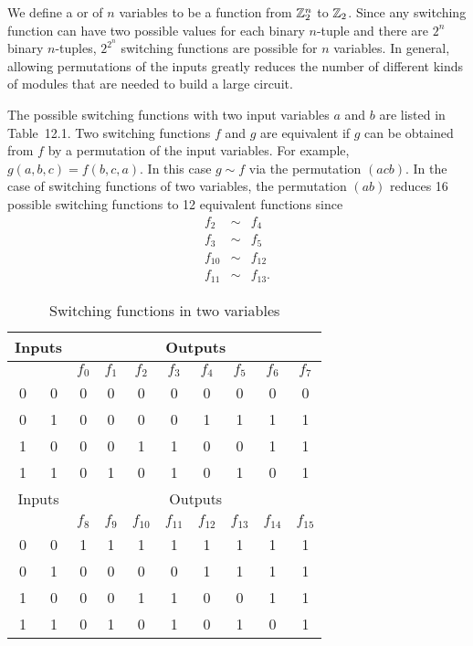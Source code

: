 \begin{example}
 
We define a  or
 of $n$
variables to be a function from ${\Bbb Z}_2^n$ to ${\Bbb Z}_2$. Since 
any switching function can have two possible values for each binary
$n$-tuple and there are $2^n$ binary $n$-tuples, $2^{2^n}$ switching
functions are possible for $n$ variables. In general, allowing
permutations of the inputs greatly reduces the number of different
kinds of modules that are needed to build a large circuit.
 
 
The possible switching functions  with two input variables $a$ and
$b$ are listed in Table~12.1. Two switching functions $f$ and $g$
are equivalent if $g$ can be obtained from $f$ by a permutation of the
input variables. For example, $g(a, b, c) = f(b, c, a)$. In this 
case $g \sim f$ via the permutation $(acb)$. In the case of switching
functions of two variables, the permutation $(ab)$ reduces 16
possible switching functions to 12 equivalent functions since
$$
\begin{array}{rcl}
f_2 & \sim & f_4 \\
f_3 & \sim & f_5 \\
f_{10} & \sim & f_{12} \\
f_{11} & \sim & f_{13}.
\end{array}
$$
 
 
\begin{table}[htb]
\caption{Switching functions in two variables}{\small
\begin{center}
\begin{tabular}{|cc|cccccccc|}
\hline
\multicolumn{2}{|c|}{Inputs}
 & \multicolumn{8}{|c|}{Outputs}    \\
\hline
         &     & $f_0$ & $f_1$ & $f_2$ & $f_3$ & $f_4$ &
$f_5$ & $f_6$ & $f_7$  \\ \hline
0 & 0   & 0 & 0 & 0 & 0 & 0 & 0 & 0 & 0 \\
0 & 1   & 0 & 0 & 0 & 0 & 1 & 1 & 1 & 1 \\
1 & 0   & 0 & 0 & 1 & 1 & 0 & 0 & 1 & 1 \\
1 & 1   & 0 & 1 & 0 & 1 & 0 & 1 & 0 & 1 \\ \hline\hline
\multicolumn{2}{|c|}{Inputs}
 & \multicolumn{8}{|c|}{Outputs}    \\
\hline
         &     & $f_8$ & $f_9$ & $f_{10}$ & $f_{11}$
& $f_{12}$ & $f_{13}$ & $f_{14}$ & $f_{15}$ \\ \hline
0 & 0   & 1 & 1 & 1 & 1 & 1 & 1 & 1 & 1 \\
0 & 1   & 0 & 0 & 0 & 0 & 1 & 1 & 1 & 1 \\
1 & 0   & 0 & 0 & 1 & 1 & 0 & 0 & 1 & 1 \\
1 & 1   & 0 & 1 & 0 & 1 & 0 & 1 & 0 & 1 \\ \hline
\end{tabular}
\end{center}
}
\end{table}
 

\end{example}
